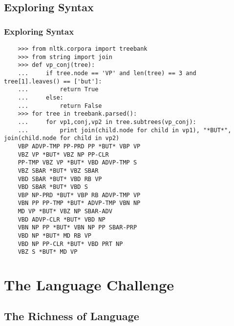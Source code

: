 \documentclass{beamer}             %
\begin{document}
\subsection{Exploring Syntax}
\begin{frame}[fragile]
  \frametitle{Exploring Syntax}
  \tiny
\begin{verbatim}
    >>> from nltk.corpora import treebank
    >>> from string import join
    >>> def vp_conj(tree):
    ...     if tree.node == 'VP' and len(tree) == 3 and tree[1].leaves() == ['but']:
    ...         return True
    ...     else:
    ...         return False
    >>> for tree in treebank.parsed():
    ...     for vp1,conj,vp2 in tree.subtrees(vp_conj):
    ...         print join(child.node for child in vp1), "*BUT*", join(child.node for child in vp2)
    VBP ADVP-TMP PP-PRD PP *BUT* VBP VP
    VBZ VP *BUT* VBZ NP PP-CLR
    PP-TMP VBZ VP *BUT* VBD ADVP-TMP S
    VBZ SBAR *BUT* VBZ SBAR
    VBD SBAR *BUT* VBD RB VP
    VBD SBAR *BUT* VBD S
    VBP NP-PRD *BUT* VBP RB ADVP-TMP VP
    VBN PP PP-TMP *BUT* ADVP-TMP VBN NP
    MD VP *BUT* VBZ NP SBAR-ADV
    VBD ADVP-CLR *BUT* VBD NP
    VBN NP PP *BUT* VBN NP PP SBAR-PRP
    VBD NP *BUT* MD RB VP
    VBD NP PP-CLR *BUT* VBD PRT NP
    VBZ S *BUT* MD VP
\end{verbatim}
\end{frame}

\section{The Language Challenge}

\subsection{The Richness of Language}
\end{document}
